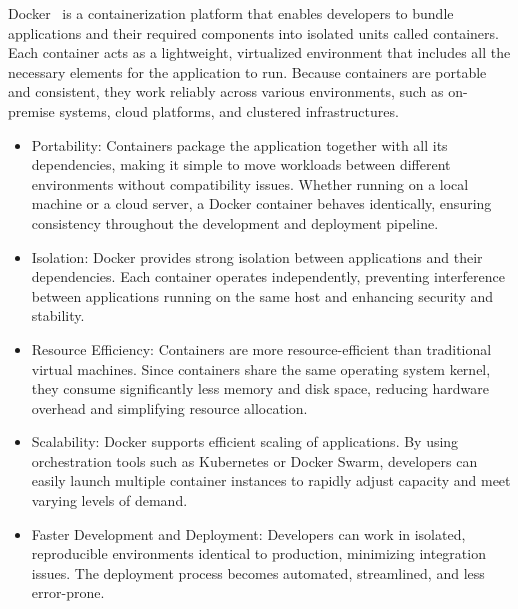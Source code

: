 Docker~\cite{docker_docs} is a containerization platform that enables developers to bundle applications and their required components into isolated units called {containers}. Each container acts as a lightweight, virtualized environment that includes all the necessary elements for the application to run. Because containers are portable and consistent, they work reliably across various environments, such as on-premise systems, cloud platforms, and clustered infrastructures.
\begin{itemize}
    \item {Portability:} Containers package the application together with all its dependencies, making it simple to move workloads between different environments without compatibility issues. Whether running on a local machine or a cloud server, a Docker container behaves identically, ensuring consistency throughout the development and deployment pipeline.
    \item {Isolation:} Docker provides strong isolation between applications and their dependencies. Each container operates independently, preventing interference between applications running on the same host and enhancing security and stability.
    \item {Resource Efficiency:} Containers are more resource-efficient than traditional virtual machines. Since containers share the same operating system kernel, they consume significantly less memory and disk space, reducing hardware overhead and simplifying resource allocation.
    \item {Scalability:} Docker supports efficient scaling of applications. By using orchestration tools such as Kubernetes or Docker Swarm, developers can easily launch multiple container instances to rapidly adjust capacity and meet varying levels of demand.
    \item {Faster Development and Deployment:} Developers can work in isolated, reproducible environments identical to production, minimizing integration issues. The deployment process becomes automated, streamlined, and less error-prone.
\end{itemize}

